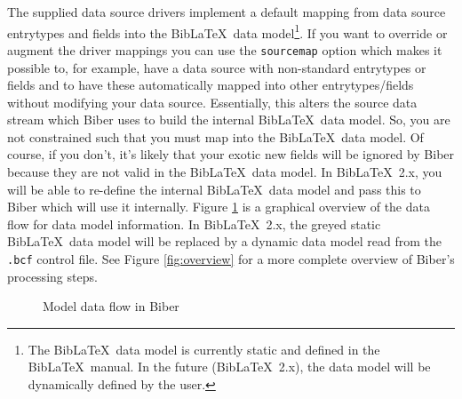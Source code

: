 \documentclass{ltxdockit}
\begin{document}
The supplied data source drivers implement a default mapping from data
source entrytypes and fields into the Bib\LaTeX\ data
model\footnote{The Bib\LaTeX\ data model is currently static and
  defined in the Bib\LaTeX\ manual. In the future (Bib\LaTeX\
  2.x), the data model will be dynamically defined by the user.}. If you
want to override or augment the driver mappings you can use the \verb+sourcemap+
option which makes it possible to, for example, have a data source with
non-standard entrytypes or fields and to have these automatically mapped
into other entrytypes/fields without modifying your data source.
Essentially, this alters the source data stream which
Biber uses to build the internal Bib\LaTeX\ data model. So, you
are not constrained such that you must map into the Bib\LaTeX\ data
model. Of course, if you don't, it's likely that your exotic new fields
will be ignored by Biber because they are not valid in the
Bib\LaTeX\ data model. In Bib\LaTeX\ 2.x, you will be able to
re-define the internal Bib\LaTeX\ data model and pass this to
Biber which will use it internally. Figure \ref{fig:biber-mdf} is a
graphical overview of the data flow for data model information. In
Bib\LaTeX\ 2.x, the greyed static Bib\LaTeX\ data model will be
replaced by a dynamic data model read from the \verb+.bcf+ control file.
See Figure \ref{fig:overview} for a more complete overview of
Biber's processing steps.

\begin{figure}[!htpb]
  \centering\small
  \caption{Model data flow in Biber}
  \label{fig:biber-mdf}
\end{figure}
\end{document}
